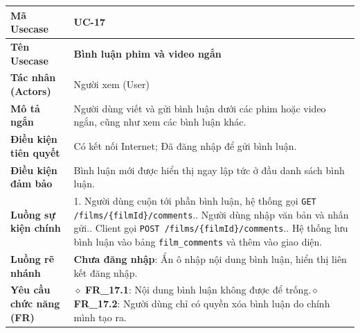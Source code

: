 \begin{table}[H]
\renewcommand{\arraystretch}{1.3}
\centering
\begin{tabularx}{\textwidth}{|p{4.5cm}|X|}
\hline
\cellcolor{gray!15}\bfseries Mã Usecase & \textbf{UC-17} \\ \hline
\cellcolor{gray!15}\bfseries Tên Usecase & \textbf{Bình luận phim và video ngắn} \\ \hline
\cellcolor{gray!15}\bfseries Tác nhân (Actors) & Người xem (User) \\ \hline
\cellcolor{gray!15}\bfseries Mô tả ngắn & Người dùng viết và gửi bình luận dưới các phim hoặc video ngắn, cũng như xem các bình luận khác. \\ \hline
\cellcolor{gray!15}\bfseries Điều kiện tiên quyết & Có kết nối Internet; Đã đăng nhập để gửi bình luận. \\ \hline
\cellcolor{gray!15}\bfseries Điều kiện đảm bảo & Bình luận mới được hiển thị ngay lập tức ở đầu danh sách bình luận. \\ \hline
\cellcolor{gray!15}\bfseries Luồng sự kiện chính & 1. Người dùng cuộn tới phần bình luận, hệ thống gọi \texttt{GET /films/\{filmId\}/comments}.\newline 2. Người dùng nhập văn bản và nhấn gửi.\newline 3. Client gọi \texttt{POST /films/\{filmId\}/comments}.\newline 4. Hệ thống lưu bình luận vào bảng \texttt{film\_comments} và thêm vào giao diện. \\ \hline
\cellcolor{gray!15}\bfseries Luồng rẽ nhánh & \textbf{Chưa đăng nhập}: Ẩn ô nhập nội dung bình luận, hiển thị liên kết đăng nhập. \\ \hline
\cellcolor{gray!15}\bfseries Yêu cầu chức năng (FR) & $\diamond$ \textbf{FR\_17.1}: Nội dung bình luận không được để trống.\newline $\diamond$ \textbf{FR\_17.2}: Người dùng chỉ có quyền xóa bình luận do chính mình tạo ra. \\ \hline
\end{tabularx}
\end{table}

